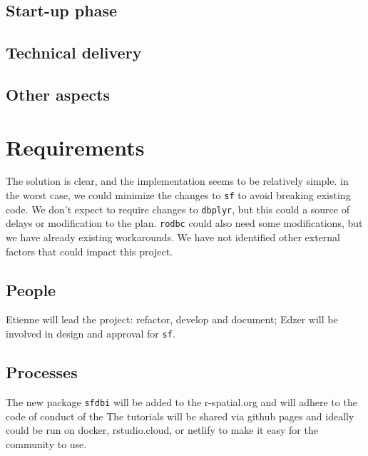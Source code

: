 \documentclass[]{article}
\begin{document}
\hypertarget{start-up-phase}{%
\subsection{Start-up phase}\label{start-up-phase}}

\hypertarget{technical-delivery}{%
\subsection{Technical delivery}\label{technical-delivery}}

\hypertarget{other-aspects}{%
\subsection{Other aspects}\label{other-aspects}}

\hypertarget{requirements}{%
\section{Requirements}\label{requirements}}

The solution is clear, and the implementation seems to be relatively
simple. in the worst case, we could minimize the changes to \texttt{sf}
to avoid breaking existing code. We don't expect to require changes to
\texttt{dbplyr}, but this could a source of delays or modification to
the plan. \texttt{rodbc} could also need some modifications, but we have
already existing workarounds. We have not identified other external
factors that could impact this project.

\hypertarget{people}{%
\subsection{People}\label{people}}

Etienne will lead the project: refactor, develop and document; Edzer
will be involved in design and approval for \texttt{sf}.

\hypertarget{processes}{%
\subsection{Processes}\label{processes}}

The new package \texttt{sfdbi} will be added to the r-spatial.org and
will adhere to the code of conduct of the The tutorials will be shared
via github pages and ideally could be run on docker, rstudio.cloud, or
netlify to make it easy for the community to use.
\end{document}
